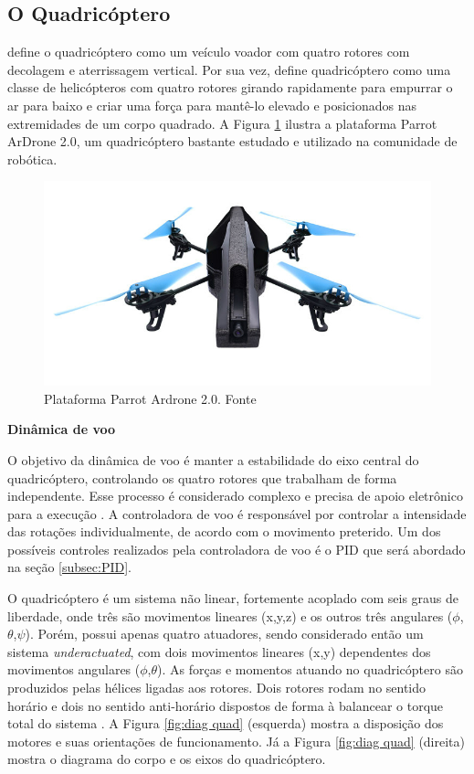 \documentclass[a4paper, 12pt]{article}
\begin{document}
\subsection{O Quadricóptero}

\cite{Salih2010} define o quadricóptero como um veículo voador com quatro rotores com decolagem e aterrissagem vertical. Por sua vez, \cite{Gibiansky2010} define quadricóptero como uma classe de helicópteros com quatro rotores girando rapidamente para empurrar o ar para baixo e criar uma força para mantê-lo elevado e posicionados nas extremidades de um corpo quadrado. A Figura \ref{fig:quad} ilustra a plataforma Parrot ArDrone 2.0, um quadricóptero bastante estudado e utilizado na comunidade de robótica.

\begin{figure}[h]
	\centering
		\includegraphics[scale=0.4]{img/parrot_drone.jpg}
	\caption{Plataforma Parrot Ardrone 2.0. Fonte \cite{ardrone}}
	\label{fig:quad}
\end{figure}

\noindent\textbf{Dinâmica de voo}

O objetivo da dinâmica de voo é manter a estabilidade do eixo central do quadricóptero,  controlando os quatro rotores que trabalham de forma independente. Esse processo é considerado complexo e precisa de apoio eletrônico para a execução \cite{Gibiansky2010}. A controladora de voo é responsável por controlar a intensidade das rotações individualmente, de acordo com o movimento preterido. Um dos possíveis controles realizados pela controladora de voo é o PID que será abordado na seção \ref{subsec:PID}.

O quadricóptero é um sistema não linear, fortemente acoplado com seis graus de liberdade, onde três são movimentos lineares (x,y,z) e os outros três angulares ($\phi$,$\theta$,$\psi$). Porém, possui apenas quatro atuadores, sendo considerado então um sistema \textit{underactuated}, com dois movimentos lineares (x,y) dependentes dos movimentos angulares ($\phi$,$\theta$). As forças e momentos atuando no quadricóptero são produzidos pelas hélices ligadas aos rotores. Dois rotores rodam no sentido horário e dois no sentido anti-horário dispostos de forma à balancear o torque total do sistema \cite{Mian2008}. A Figura \ref{fig:diag quad} (esquerda) mostra a disposição dos motores e suas orientações de funcionamento. Já a Figura \ref{fig:diag quad} (direita)  mostra o diagrama do corpo e os eixos do quadricóptero.
\end{document}
